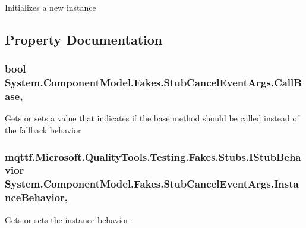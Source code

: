 Initializes a new instance



\subsection{Property Documentation}
\hypertarget{class_system_1_1_component_model_1_1_fakes_1_1_stub_cancel_event_args_aca7dd7a17b868613743e4b709ea73054}{
\subsubsection[{Call\-Base}]{\setlength{\rightskip}{0pt plus 5cm}bool System.\-Component\-Model.\-Fakes.\-Stub\-Cancel\-Event\-Args.\-Call\-Base\hspace{0.3cm}{\ttfamily [get]}, {\ttfamily [set]}}}\label{class_system_1_1_component_model_1_1_fakes_1_1_stub_cancel_event_args_aca7dd7a17b868613743e4b709ea73054}


Gets or sets a value that indicates if the base method should be called instead of the fallback behavior

\hypertarget{class_system_1_1_component_model_1_1_fakes_1_1_stub_cancel_event_args_a61c28c0a7d3b25a4bde571ca2004d962}{
\subsubsection[{Instance\-Behavior}]{\setlength{\rightskip}{0pt plus 5cm}mqttf.\-Microsoft.\-Quality\-Tools.\-Testing.\-Fakes.\-Stubs.\-I\-Stub\-Behavior System.\-Component\-Model.\-Fakes.\-Stub\-Cancel\-Event\-Args.\-Instance\-Behavior\hspace{0.3cm}{\ttfamily [get]}, {\ttfamily [set]}}}\label{class_system_1_1_component_model_1_1_fakes_1_1_stub_cancel_event_args_a61c28c0a7d3b25a4bde571ca2004d962}


Gets or sets the instance behavior.

